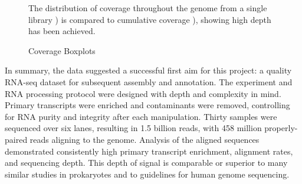 \begin{figure}
\begin{center}
\begin{minipage}{.5\textwidth}
\begin{center}
\label{fig:4.6b}
\end{center}
\end{minipage}
\end{center}
\caption{Coverage Boxplots}
The distribution of coverage throughout the genome from a single library ) is compared to cumulative coverage ), showing high depth has been achieved.
\end{figure}

In summary, the data suggested a successful first aim for this project: a quality RNA-seq dataset for subsequent assembly and annotation. The experiment and RNA processing protocol were designed with depth and complexity in mind. Primary transcripts were enriched and contaminants were removed, controlling for RNA purity and integrity after each manipulation. Thirty samples were sequenced over six lanes, resulting in 1.5 billion reads, with 458 million properly-paired reads aligning to the genome. Analysis of the aligned sequences demonstrated consistently high primary transcript enrichment, alignment rates, and sequencing depth. This depth of signal is comparable or superior to many similar studies in prokaryotes and to guidelines for human genome sequencing.



